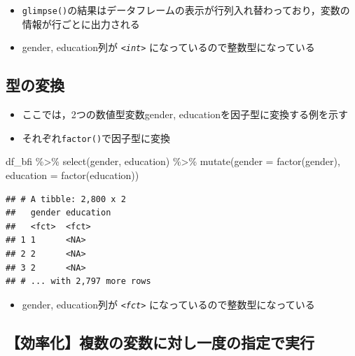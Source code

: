 \documentclass[
  xelatex,ja=standard, b5paper]{bxjsbook}
\newenvironment{Shaded}{\begin{snugshade}}{\end{snugshade}}
\newcommand{\AttributeTok}[1]{\textcolor[rgb]{0.77,0.63,0.00}{#1}}
\newcommand{\FunctionTok}[1]{\textcolor[rgb]{0.00,0.00,0.00}{#1}}
\newcommand{\NormalTok}[1]{#1}
\newcommand{\SpecialCharTok}[1]{\textcolor[rgb]{0.00,0.00,0.00}{#1}}
\providecommand{\tightlist}{%
  \setlength{\itemsep}{0pt}\setlength{\parskip}{0pt}}
\begin{document}
\begin{itemize}
\tightlist
\item
  \texttt{glimpse()}の結果はデータフレームの表示が行列入れ替わっており，変数の情報が行ごとに出力される
\item
  gender, education列が \emph{\texttt{\textless{}int\textgreater{}}} になっているので整数型になっている
\end{itemize}

\hypertarget{mu-kata-trans}{%
\subsection{型の変換}\label{mu-kata-trans}}

\begin{itemize}
\tightlist
\item
  ここでは，2つの数値型変数gender, educationを因子型に変換する例を示す
\item
  それぞれ\texttt{factor()}で因子型に変換
\end{itemize}

\begin{Shaded}
\begin{Highlighting}[]
\NormalTok{df\_bfi }\SpecialCharTok{\%\textgreater{}\%}
  \FunctionTok{select}\NormalTok{(gender, education) }\SpecialCharTok{\%\textgreater{}\%} 
  \FunctionTok{mutate}\NormalTok{(}\AttributeTok{gender =} \FunctionTok{factor}\NormalTok{(gender),}
         \AttributeTok{education =} \FunctionTok{factor}\NormalTok{(education))}
\end{Highlighting}
\end{Shaded}

\begin{verbatim}
## # A tibble: 2,800 x 2
##   gender education
##   <fct>  <fct>    
## 1 1      <NA>     
## 2 2      <NA>     
## 3 2      <NA>     
## # ... with 2,797 more rows
\end{verbatim}

\begin{itemize}
\tightlist
\item
  gender, education列が \emph{\texttt{\textless{}fct\textgreater{}}} になっているので整数型になっている
\end{itemize}

\hypertarget{mu-kata-across}{%
\subsection{【効率化】複数の変数に対し一度の指定で実行}\label{mu-kata-across}}
\end{document}
